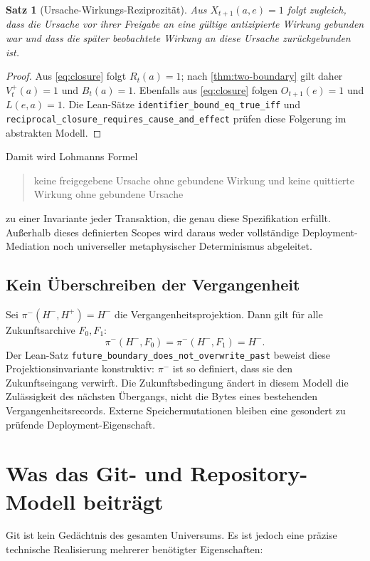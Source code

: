 \documentclass[11pt,a4paper]{article}
\newtheorem{satz}{Satz}[section]
\theoremstyle{remark}
\begin{document}
\begin{satz}[Ursache-Wirkungs-Reziprozität]
\label{thm:reciprocal}
Aus \(X_{t+1}(a,e)=1\) folgt zugleich, dass die Ursache vor ihrer Freigabe an
eine gültige antizipierte Wirkung gebunden war und dass die später
beobachtete Wirkung an diese Ursache zurückgebunden ist.
\end{satz}

\begin{proof}
Aus \cref{eq:closure} folgt \(R_t(a)=1\); nach
\cref{thm:two-boundary} gilt daher \(V_t^+(a)=1\) und \(B_t(a)=1\).
Ebenfalls aus \cref{eq:closure} folgen \(O_{t+1}(e)=1\) und
\(L(e,a)=1\). Die Lean-Sätze
\texttt{identifier\_bound\_eq\_true\_iff} und
\texttt{reciprocal\_closure\_requires\_cause\_and\_effect} prüfen diese
Folgerung im abstrakten Modell.
\end{proof}

Damit wird Lohmanns Formel
\begin{quote}
keine freigegebene Ursache ohne gebundene Wirkung und keine quittierte
Wirkung ohne gebundene Ursache
\end{quote}
zu einer Invariante jeder Transaktion, die genau diese Spezifikation erfüllt.
Außerhalb dieses definierten Scopes wird daraus weder vollständige
Deployment-Mediation noch universeller metaphysischer Determinismus
abgeleitet.

\subsection{Kein Überschreiben der Vergangenheit}

Sei \(\pi^-(H^-,H^+)=H^-\) die Vergangenheitsprojektion.
Dann gilt für alle Zukunftsarchive \(F_0,F_1\):
\[
  \pi^-(H^-,F_0)=\pi^-(H^-,F_1)=H^-.
\]
Der Lean-Satz
\texttt{future\_boundary\_does\_not\_overwrite\_past} beweist diese
Projektionsinvariante konstruktiv: \(\pi^-\) ist so definiert, dass sie den
Zukunftseingang verwirft. Die Zukunftsbedingung ändert in diesem Modell die
Zulässigkeit des nächsten Übergangs, nicht die Bytes eines bestehenden
Vergangenheitsrecords. Externe Speichermutationen bleiben eine gesondert zu
prüfende Deployment-Eigenschaft.

\section{Was das Git- und Repository-Modell beiträgt}

Git ist kein Gedächtnis des gesamten Universums. Es ist jedoch eine präzise
technische Realisierung mehrerer benötigter Eigenschaften:
\end{document}
